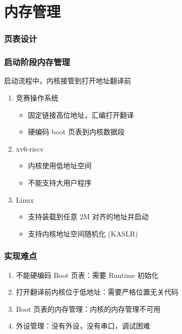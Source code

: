 \section{内存管理}


\begin{frame}
    \frametitle{页表设计}



\end{frame}

\begin{frame}
    \frametitle{启动阶段内存管理}

    启动流程中，内核接管到打开地址翻译前

    \begin{enumerate}
        \item 竞赛操作系统
              \begin{itemize}
                  \item 固定链接高位地址，汇编打开翻译
                  \item 硬编码 boot 页表到内核数据段
              \end{itemize}
        \item xv6-riscv
              \begin{itemize}
                  \item 内核使用低地址空间
                  \item 不能支持大用户程序
              \end{itemize}
        \item Linux
              \begin{itemize}
                  \item 支持装载到任意 2M 对齐的地址并启动
                  \item 支持内核地址空间随机化 (KASLR)
              \end{itemize}
    \end{enumerate}

\end{frame}

\begin{frame}
    \frametitle{实现难点}


    \begin{enumerate}
        \item 不能硬编码 Boot 页表：需要 Runtime 初始化
        \item 打开翻译前内核位于低地址：需要严格位置无关代码
        \item Boot 页表的内存管理：内核的内存管理不可用
        \item 外设管理：没有外设，没有串口，调试困难
    \end{enumerate}

\end{frame}

